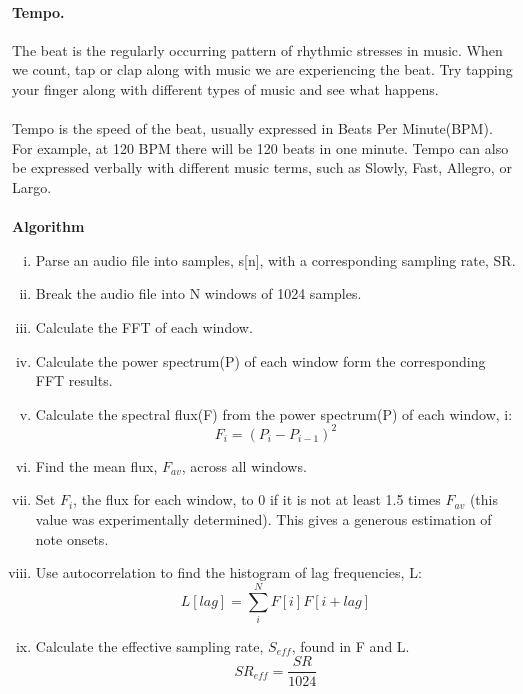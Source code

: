\paragraph{Tempo.}
The beat is the regularly occurring pattern of rhythmic stresses in music. When we count, tap or clap along 
with music we are experiencing the beat. Try tapping your finger along with different types of music and see 
what happens.\\ 
\\
Tempo is the speed of the beat, usually expressed in Beats Per Minute(BPM). For example, at 120 BPM 
there will be 120 beats in one minute. Tempo can also be expressed verbally with different music terms, 
such as Slowly, Fast, Allegro, or Largo.\\
\\
\textbf{Algorithm}
\begin{enumerate}[(i)]
        \item Parse an audio file into samples, s[n], with a corresponding sampling rate, SR.
        \item Break the audio file into N windows of 1024 samples.
        \item Calculate the FFT of each window.
        \item Calculate the power spectrum(P) of each window form the corresponding FFT results.
        \item Calculate the spectral flux(F) from the power spectrum(P) of each window, i:
                \begin{equation}
                        F_i = (P_i - P_{i-1})^2
                \end{equation}
        \item Find the mean flux, $F_{av}$, across all windows.
        \item Set $F_i$, the flux for each window, to 0 if it is not at least 1.5 times $F_{av}$ (this value
                was experimentally determined). This gives a generous estimation of note onsets.
        \item Use autocorrelation to find the histogram of lag frequencies, L:
                \begin{equation}
                        L[lag] = \sum_{i}^{N}{F[i]F[i+lag]}
                \end{equation}
        \item Calculate the effective sampling rate, $S_{eff}$, found in F and L.
                \begin{equation}
                        SR_{eff} = \frac{SR}{1024}

\end{equation}
\end{enumerate}
